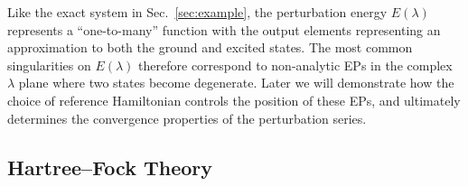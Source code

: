 \documentclass[aps,prb,reprint,noshowkeys,linenumbers,superscriptaddress]{revtex4-1}
\begin{document}
Like the exact system in Sec.~\ref{sec:example}, the perturbation energy $E(\lambda)$ represents
a ``one-to-many'' function with the output elements representing an approximation to both the ground and excited states.
The most common singularities on $E(\lambda)$ therefore correspond to non-analytic EPs in the complex 
$\lambda$ plane where two states become degenerate.
Later we will demonstrate how the choice of reference Hamiltonian controls the position of these EPs, and 
ultimately determines the convergence properties of the perturbation series.

\subsection{Hartree--Fock Theory}
\label{sec:HF}
\end{document}

